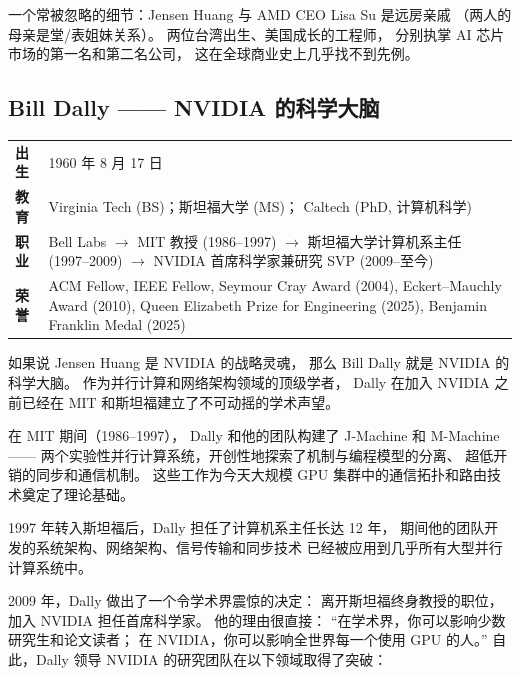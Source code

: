 一个常被忽略的细节：Jensen Huang 与 AMD CEO Lisa Su 是远房亲戚
（两人的母亲是堂/表姐妹关系）。
两位台湾出生、美国成长的工程师，
分别执掌 AI 芯片市场的第一名和第二名公司，
这在全球商业史上几乎找不到先例。

\subsection{Bill Dally —— NVIDIA 的科学大脑}
\label{subsec:bill-dally}

\begin{keybox}
\small
\begin{tabularx}{\textwidth}{lX}
\toprule
\textbf{出生} & 1960 年 8 月 17 日 \\
\textbf{教育} & Virginia Tech (BS)；斯坦福大学 (MS)；
                Caltech (PhD, 计算机科学) \\
\textbf{职业} & Bell Labs $\to$ MIT 教授 (1986--1997) $\to$
                斯坦福大学计算机系主任 (1997--2009) $\to$
                NVIDIA 首席科学家兼研究 SVP (2009--至今) \\
\textbf{荣誉} & ACM Fellow, IEEE Fellow, Seymour Cray Award (2004),
                Eckert--Mauchly Award (2010),
                Queen Elizabeth Prize for Engineering (2025),
                Benjamin Franklin Medal (2025) \\
\bottomrule
\end{tabularx}
\end{keybox}

如果说 Jensen Huang 是 NVIDIA 的战略灵魂，
那么 Bill Dally 就是 NVIDIA 的科学大脑。
作为并行计算和网络架构领域的顶级学者，
Dally 在加入 NVIDIA 之前已经在 MIT 和斯坦福建立了不可动摇的学术声望。

在 MIT 期间（1986--1997），
Dally 和他的团队构建了 J-Machine 和 M-Machine——
两个实验性并行计算系统，开创性地探索了机制与编程模型的分离、
超低开销的同步和通信机制。
这些工作为今天大规模 GPU 集群中的通信拓扑和路由技术奠定了理论基础。

1997 年转入斯坦福后，Dally 担任了计算机系主任长达 12 年，
期间他的团队开发的系统架构、网络架构、信号传输和同步技术
已经被应用到几乎所有大型并行计算系统中。

2009 年，Dally 做出了一个令学术界震惊的决定：
离开斯坦福终身教授的职位，加入 NVIDIA 担任首席科学家。
他的理由很直接：
``在学术界，你可以影响少数研究生和论文读者；
在 NVIDIA，你可以影响全世界每一个使用 GPU 的人。''
自此，Dally 领导 NVIDIA 的研究团队在以下领域取得了突破：


